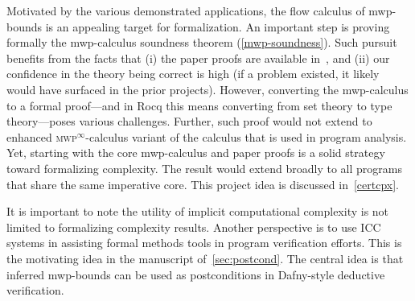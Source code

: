 Motivated by the various demonstrated applications, the flow calculus of mwp-bounds is an appealing target for formalization.
An important step is proving formally the mwp-calculus soundness theorem (\autoref{mwp-soundness}).
Such pursuit benefits from the facts that
(i) the paper proofs are available in~\cite{jones2009}, and
(ii) our confidence in the theory being correct is high (\ie if a problem existed, it likely would have surfaced in the prior projects).
However, converting the mwp-calculus to a formal proof---and in Rocq this means converting from set theory to type theory---poses various challenges.
Further, such proof would not extend to enhanced \textsc{mwp}$^\infty$-calculus variant of the calculus that is used in program analysis.
Yet, starting with the core mwp-calculus and paper proofs is a solid strategy toward formalizing complexity.
The result would extend broadly to all programs that share the same imperative core.
This project idea is discussed in~\autoref{certcpx}.

It is important to note the utility of implicit computational complexity is not limited to formalizing complexity results.
Another perspective is to use ICC systems in assisting formal methods tools in program verification efforts.
This is the motivating idea in the manuscript of~\autoref{sec:postcond}.
The central idea is that inferred mwp-bounds can be used as postconditions in Dafny-style deductive verification.
